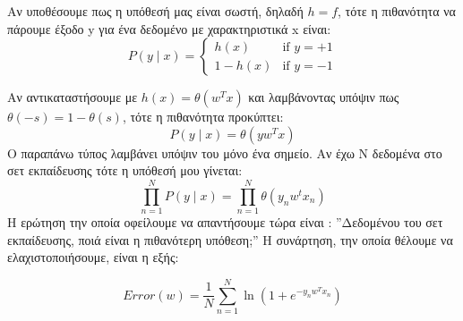 Αν υποθέσουμε πως η υπόθεσή μας είναι σωστή, δηλαδή $h=f$, τότε η πιθανότητα να πάρουμε έξοδο y για ένα δεδομένο με χαρακτηριστικά x είναι:
\begin{equation}
P(y \mid x)=\left\{
\begin{array}{ll}
h(x)  & \mbox{if } y = +1 \\
1 - h(x)  & \mbox{if } y = -1
\end{array}
\right.
\end{equation}

Αν αντικαταστήσουμε με $h(x)=\theta(w^T x)$ και λαμβάνοντας υπόψιν πως $\theta(-s)= 1 - \theta(s)$, τότε η πιθανότητα  προκύπτει:
\begin{equation}
P(y \mid x)= \theta(y w^T x)
\end{equation}
Ο παραπάνω τύπος λαμβάνει υπόψιν του μόνο ένα σημείο. Αν έχω N δεδομένα στο σετ εκπαίδευσης τότε η υπόθεσή μου γίνεται:
\begin{equation}
\prod_{n=1}^{N} P(y \mid x)= \prod_{n=1}^{N} \theta (y_n w^t x_n)
\end{equation}
Η ερώτηση την οποία οφείλουμε να απαντήσουμε τώρα είναι : ”Δεδομένου του σετ εκπαίδευσης, ποιά είναι η πιθανότερη υπόθεση;” Η συνάρτηση, την οποία θέλουμε να ελαχιστοποιήσουμε, είναι η εξής:

\begin{equation}
Error(w)= \frac{1}{N} \sum_{n=1}^{N} \ln (1 + e^{- y_n w^T x_n} )
\end{equation}


